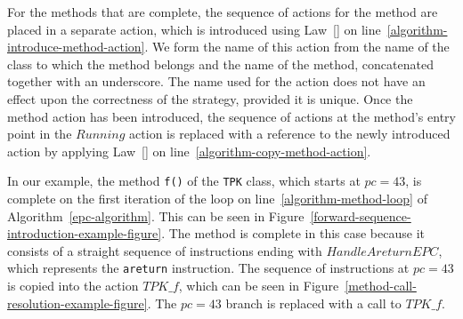 For the methods that are complete, the sequence of actions for the
method are placed in a separate action, which is introduced using
Law~[] on
line~\ref{algorithm-introduce-method-action}.
We form the name of this action from the name of the class to which
the method belongs and the name of the method, concatenated together
with an underscore.
The name used for the action does not have an effect upon the
correctness of the strategy, provided it is unique.
Once the method action has been introduced, the sequence of actions at
the method's entry point in the $Running$ action is replaced with a
reference to the newly introduced action by applying
Law~[] on
line~\ref{algorithm-copy-method-action}.

In our example, the method \texttt{f()} of the \texttt{TPK} class,
which starts at $pc = 43$, is complete on the first iteration of the
loop on line~\ref{algorithm-method-loop} of
Algorithm~\ref{epc-algorithm}.
This can be seen in
Figure~\ref{forward-sequence-introduction-example-figure}.
The method is complete in this case because it consists of a straight
sequence of instructions ending with $HandleAreturnEPC$, which
represents the \texttt{areturn} instruction.
The sequence of instructions at $pc = 43$ is copied into the action $TPK\_f$,
which can be seen in
Figure~\ref{method-call-resolution-example-figure}.
The $pc = 43$ branch is replaced with a call to $TPK\_f$.

